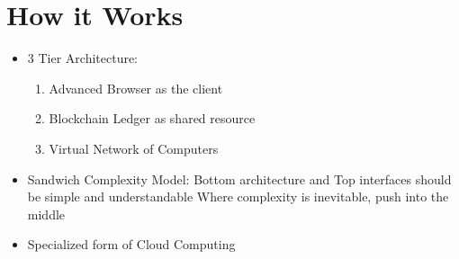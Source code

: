 \documentclass{article}
\begin{document}
\section*{How it Works}
\begin{itemize}
  \item 3 Tier Architecture:
    \begin{enumerate}
      \item Advanced Browser as the client
      \item Blockchain Ledger as shared resource
      \item Virtual Network of Computers
    \end{enumerate}
  \item Sandwich Complexity Model:
    \subitem Bottom architecture and Top interfaces should be simple and understandable
    \subitem Where complexity is inevitable, push into the middle
  \item Specialized form of Cloud Computing
\end{itemize}
\end{document}
